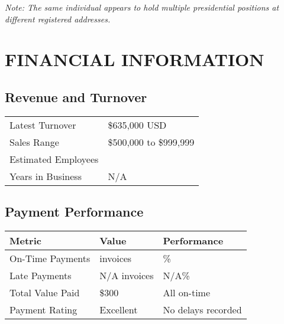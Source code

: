 \documentclass[11pt,a4paper]{article}
\begin{document}
\textit{Note: The same individual appears to hold multiple presidential positions at different registered addresses.}

\section{FINANCIAL INFORMATION}

\subsection{Revenue and Turnover}
\begin{tabularx}{\textwidth}{|>{\raggedright\arraybackslash}p{4cm}|>{\raggedright\arraybackslash}X|}
\hline
\rowcolor{lightgray}
\multicolumn{2}{|c|}{\textbf{FINANCIAL OVERVIEW}} \\
\hline
Latest Turnover & \$635,000 USD \\
\hline
Sales Range & \$500,000 to \$999,999 \\
\hline
Estimated Employees & 1 \\
\hline
Years in Business & N/A \\
\hline
\end{tabularx}

\subsection{Payment Performance}
\begin{tabularx}{\textwidth}{|>{\raggedright\arraybackslash}p{4cm}|>{\raggedright\arraybackslash}p{4cm}|>{\raggedright\arraybackslash}X|}
\hline
\rowcolor{lightgray}
\textbf{Metric} & \textbf{Value} & \textbf{Performance} \\
\hline
On-Time Payments & 3 invoices & 100\% \\
\hline
Late Payments & N/A invoices & N/A\% \\
\hline
Total Value Paid & \$300 & All on-time \\
\hline
Payment Rating & Excellent & No delays recorded \\
\hline
\end{tabularx}

\end{document}
